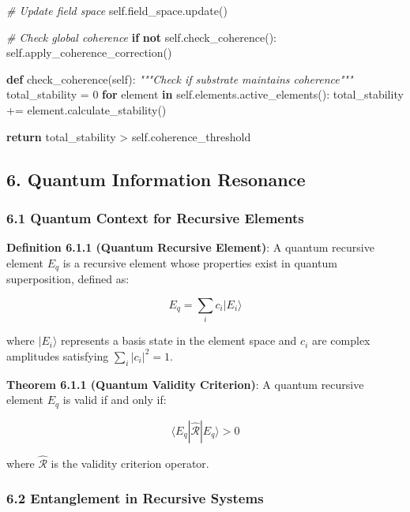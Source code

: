 \documentclass[
]{article}
\newenvironment{Shaded}{}{}
\newcommand{\CommentTok}[1]{\textcolor[rgb]{0.38,0.63,0.69}{\textit{#1}}}
\newcommand{\ControlFlowTok}[1]{\textcolor[rgb]{0.00,0.44,0.13}{\textbf{#1}}}
\newcommand{\DecValTok}[1]{\textcolor[rgb]{0.25,0.63,0.44}{#1}}
\newcommand{\KeywordTok}[1]{\textcolor[rgb]{0.00,0.44,0.13}{\textbf{#1}}}
\newcommand{\NormalTok}[1]{#1}
\newcommand{\OperatorTok}[1]{\textcolor[rgb]{0.40,0.40,0.40}{#1}}
\newcommand{\VariableTok}[1]{\textcolor[rgb]{0.10,0.09,0.49}{#1}}
\begin{document}
\begin{Shaded}
\begin{Highlighting}[]
        \CommentTok{\# Update field space}
        \VariableTok{self}\NormalTok{.field\_space.update()}

        \CommentTok{\# Check global coherence}
        \ControlFlowTok{if} \KeywordTok{not} \VariableTok{self}\NormalTok{.check\_coherence():}
            \VariableTok{self}\NormalTok{.apply\_coherence\_correction()}

    \KeywordTok{def}\NormalTok{ check\_coherence(}\VariableTok{self}\NormalTok{):}
        \CommentTok{"""Check if substrate maintains coherence"""}
\NormalTok{        total\_stability }\OperatorTok{=} \DecValTok{0}
        \ControlFlowTok{for}\NormalTok{ element }\KeywordTok{in} \VariableTok{self}\NormalTok{.elements.active\_elements():}
\NormalTok{            total\_stability }\OperatorTok{+=}\NormalTok{ element.calculate\_stability()}

        \ControlFlowTok{return}\NormalTok{ total\_stability }\OperatorTok{\textgreater{}} \VariableTok{self}\NormalTok{.coherence\_threshold}
\end{Highlighting}
\end{Shaded}

\subsection{6. Quantum Information
Resonance}\label{quantum-information-resonance}

\subsubsection{6.1 Quantum Context for Recursive
Elements}\label{quantum-context-for-recursive-elements}

\textbf{Definition 6.1.1 (Quantum Recursive Element)}: A quantum
recursive element \(E_q\) is a recursive element whose properties exist
in quantum superposition, defined as:

\[E_q = \sum_i c_i |E_i\rangle\]

where \(|E_i\rangle\) represents a basis state in the element space and
\(c_i\) are complex amplitudes satisfying \(\sum_i |c_i|^2 = 1\).

\textbf{Theorem 6.1.1 (Quantum Validity Criterion)}: A quantum recursive
element \(E_q\) is valid if and only if:

\[\langle E_q | \hat{\mathcal{R}} | E_q \rangle > 0\]

where \(\hat{\mathcal{R}}\) is the validity criterion operator.

\subsubsection{6.2 Entanglement in Recursive
Systems}\label{entanglement-in-recursive-systems}
\end{document}

